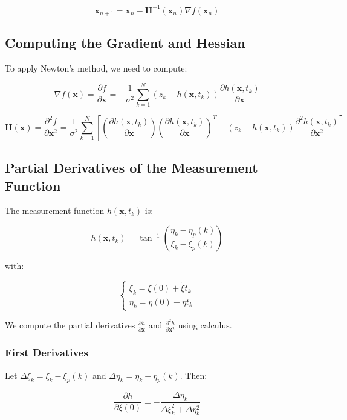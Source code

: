 \documentclass[12pt]{article}
\begin{document}
\[
\mathbf{x}_{n+1} = \mathbf{x}_n - \mathbf{H}^{-1}(\mathbf{x}_n) \nabla f(\mathbf{x}_n)
\]

\subsection{Computing the Gradient and Hessian}

To apply Newton's method, we need to compute:

\[
\nabla f(\mathbf{x}) = \frac{\partial f}{\partial \mathbf{x}} = -\frac{1}{\sigma^2} \sum_{k=1}^{N} \left( z_k - h(\mathbf{x}, t_k) \right) \frac{\partial h(\mathbf{x}, t_k)}{\partial \mathbf{x}}
\]

\[
\mathbf{H}(\mathbf{x}) = \frac{\partial^2 f}{\partial \mathbf{x}^2} = \frac{1}{\sigma^2} \sum_{k=1}^{N} \left[ \left( \frac{\partial h(\mathbf{x}, t_k)}{\partial \mathbf{x}} \right) \left( \frac{\partial h(\mathbf{x}, t_k)}{\partial \mathbf{x}} \right)^T - \left( z_k - h(\mathbf{x}, t_k) \right) \frac{\partial^2 h(\mathbf{x}, t_k)}{\partial \mathbf{x}^2} \right]
\]

\subsection{Partial Derivatives of the Measurement Function}

The measurement function \( h(\mathbf{x}, t_k) \) is:

\[
h(\mathbf{x}, t_k) = \tan^{-1} \left( \frac{\eta_k - \eta_p(k)}{\xi_k - \xi_p(k)} \right)
\]

with:

\[
\begin{cases}
\xi_k = \xi(0) + \dot{\xi} t_k \\
\eta_k = \eta(0) + \dot{\eta} t_k
\end{cases}
\]

We compute the partial derivatives \( \frac{\partial h}{\partial \mathbf{x}} \) and \( \frac{\partial^2 h}{\partial \mathbf{x}^2} \) using calculus.

\subsubsection{First Derivatives}

Let \( \Delta \xi_k = \xi_k - \xi_p(k) \) and \( \Delta \eta_k = \eta_k - \eta_p(k) \). Then:

\[
\frac{\partial h}{\partial \xi(0)} = -\frac{\Delta \eta_k}{\Delta \xi_k^2 + \Delta \eta_k^2}
\]
\end{document}

